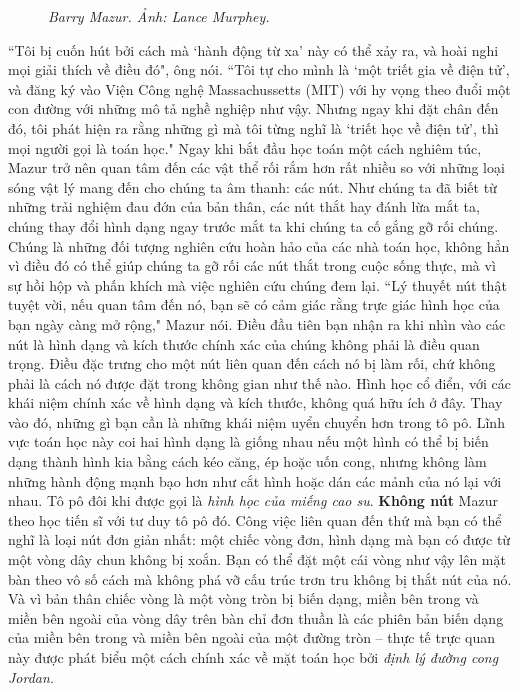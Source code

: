 \begin{multicols}{2}
\begin{figure}[H]
		\caption{\small\textit{\color{duongvaotoanhoc}Barry Mazur. Ảnh: Lance Murphey.}}
		\vspace*{-10pt}
	\end{figure}
	``Tôi bị cuốn hút bởi cách mà `hành động từ xa' này có thể xảy ra, và hoài nghi mọi giải thích về điều đó", ông nói. ``Tôi tự cho mình là `một triết gia về điện tử', và đăng ký vào Viện Công nghệ Massachussetts (MIT) với hy vọng theo đuổi một con đường với những mô tả nghề nghiệp như vậy. Nhưng ngay khi đặt chân đến đó, tôi phát hiện ra rằng những gì mà tôi từng nghĩ là `triết học về điện tử', thì mọi người gọi là toán học."
	\vskip 0.05cm
	Ngay khi bắt đầu học toán một cách nghiêm túc, Mazur trở nên quan tâm đến các vật thể rối rắm  hơn rất nhiều so với những loại sóng vật lý mang đến cho chúng ta âm thanh: các nút. Như chúng ta đã biết từ những trải nghiệm đau đớn của bản thân, các nút thắt hay đánh lừa mắt ta, chúng thay đổi hình dạng ngay trước mắt ta khi chúng ta cố gắng gỡ rối chúng. Chúng là những đối tượng nghiên cứu hoàn hảo của các nhà toán học, không hẳn vì điều đó có thể giúp chúng ta gỡ rối các nút thắt trong cuộc sống thực, mà vì sự hồi hộp và phấn khích mà việc nghiên cứu chúng đem lại. ``Lý thuyết nút thật tuyệt vời, nếu quan tâm đến nó, bạn sẽ có cảm giác rằng trực giác hình học của bạn ngày càng mở rộng," Mazur nói.
	\vskip 0.05cm
	Điều đầu tiên bạn nhận ra khi nhìn vào các nút là hình dạng và kích thước chính xác của chúng không phải là điều quan trọng. Điều đặc trưng cho một nút liên quan đến cách nó bị làm rối, chứ không phải là cách nó được đặt trong không gian như thế nào. Hình học cổ điển, với các khái niệm chính xác về hình dạng và kích thước, không quá hữu ích ở đây. Thay vào đó, những gì bạn cần là những khái niệm uyển chuyển hơn trong tô pô. Lĩnh vực toán học này coi hai hình dạng là giống nhau nếu một hình có thể bị biến dạng thành hình kia bằng cách kéo căng, ép hoặc uốn cong, nhưng không làm những hành động mạnh bạo hơn như cắt hình hoặc dán các mảnh của nó lại với nhau. Tô pô đôi khi được gọi là \textit{hình học của miếng cao su}.
	\vskip 0.05cm
	\textbf{\color{duongvaotoanhoc}Không nút}
	\vskip 0.05cm
	Mazur theo học tiến sĩ với tư duy tô pô đó. Công việc liên quan đến thứ mà  bạn có thể nghĩ là loại nút đơn giản nhất: một chiếc vòng đơn, hình dạng mà bạn có được từ một vòng dây chun không bị xoắn. Bạn có thể đặt một cái vòng như vậy lên mặt bàn theo vô số cách mà không phá vỡ cấu trúc trơn tru không bị thắt nút của nó. Và vì bản thân chiếc vòng là một vòng tròn bị biến dạng, miền bên trong và miền bên ngoài của vòng dây trên bàn chỉ đơn thuần là các phiên bản biến dạng của miền bên trong và miền bên ngoài của một đường tròn -- thực tế trực quan này được phát biểu một cách chính xác về mặt toán học bởi \textit{định lý đường cong Jordan}.

\end{multicols}
